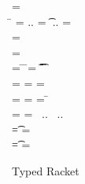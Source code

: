 \documentclass[acmlarge, anonymous, authordraft, review]{acmart} %
\begin{document}
\begin{figure}[!b]

\hrulefill

\medskip

 \small
\begin{minipage}{12cm}  
\begin{tabbing}
 =  \\
\hspace{4.6cm}\= \WHERE\HS 
  \mdp[1] = \src{\Mdef\m\x\t\tp{\ep[1]}} ..\HS\HS
  \md[1] = \Mdef\m\x\t\tp{\e[1]} ..\HS\HS
  \ep[1] = \TRG{\e[1]}{\x:\t\,\this:\C}
\\
\TRG\x\Env = \src{\x}
\\
\TRG{\FRead\f}\Env  = \src{\FRead\f}
\\
\TRG{\FWrite\f\e}\Env =  \src{\FWrite\f\ep} 
\>\WHERE\HS
\= \TypeCk\K{\this}\C \HS\HS
\=  \ep = \TAG\e\Env\t \HS\HS
\= \Ftype\f\t\In\App\K\C
\\
\TRG{\Call{\e[1]}\m{\e[2]}}\Env = \src{\DynCall{\ep[1]}\m{\ep[2]}}
\>\WHERE \> \TypeCk{\K,\Env}{\e[1]}\any \HS
\> \ep[1] = \TRG{\e[1]}\Env \HS
\> \ep[2] = \TAG{\e[2]}\Env\any
\\
\TRG{\Call{\e[1]}\m{\e[2]}}\Env = \src{\KCall{\ep[1]}\m{\ep[2]}{\D[1]}{\D[2]}}
\>\WHERE \> \TypeCk{\K,\Env}{\e[1]}\C 
\> \ep[1] = \TRG{\e[1]}\Env\HS\HS
\> \ep[2] = \TAG{\e[2]}\Env{\D[1]} \HS\HS
\=  \Mtype\m{\D[1]}{\D[2]}\In\App\K\C 
\\
\Env =  
\>\WHERE \>  \ep[1] = \TAG{\e[1]}\Env{\t[1]} ~..
\> \Ftype{\f[1]}{\t[1]}\In\App\K\C ~..
\\
\TAG\e\Env\t = \src\ep
\> \WHERE\> \TypeCk{\K,\Env}\e\tp \HS
\> \EM{\K\vdash \t \Sub \tp}
\>  \ep = \TRG\e\Env
\\
\TAG\e\Env\t = \src{\BehCast\t\e}
\>\WHERE\> \TypeCk{\K,\Env}\e\tp \HS
   \> \EM{\K\vdash \t \not \Sub \tp}
  \>     \ep = \TRG\e\Env
\end{tabbing}
\end{minipage}

\medskip

\hrulefill
\caption{Typed Racket}\label{trtr}
\end{figure}
\end{document}
